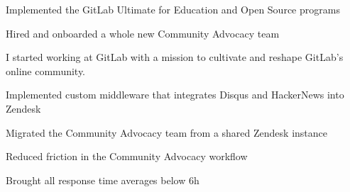 \documentclass[]{matija-resume}
\begin{document}
\begin{minipage}[t]{1.0\textwidth}

\begin{tightemize}
\item Implemented the GitLab Ultimate for Education and Open Source programs
\item Hired and onboarded a whole new Community Advocacy team
\end{tightemize}
\sectionsep

\vspace{\topsep}
I started working at GitLab with a mission to cultivate and reshape GitLab's online community.
\vspace{\topsep}
\begin{tightemize}
\item Implemented custom middleware that integrates Disqus and HackerNews into Zendesk
\item Migrated the Community Advocacy team from a shared Zendesk instance
\item Reduced friction in the Community Advocacy workflow
\item Brought all response time averages below 6h
\end{tightemize}
\sectionsep

\end{minipage}
\end{document}
